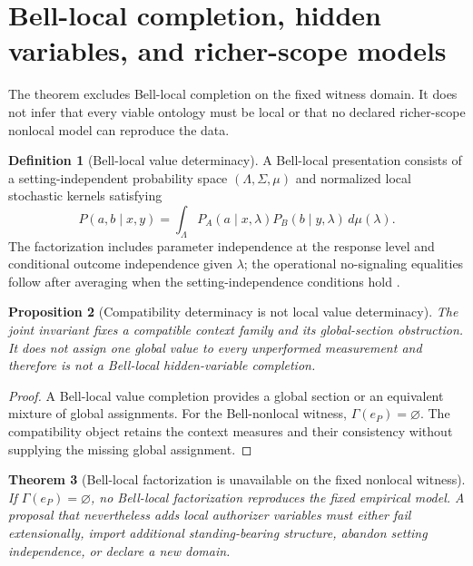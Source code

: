 \documentclass[11pt]{article}
\newtheorem{theorem}{Theorem}[section]
\newtheorem{proposition}[theorem]{Proposition}
\theoremstyle{definition}
\newtheorem{definition}[theorem]{Definition}
\newcommand{\GlobalSec}{\Gamma}
\begin{document}
\section{Bell-local completion, hidden variables, and richer-scope models}\label{sec:hiddenvariables}

The theorem excludes Bell-local completion on the fixed witness domain. It does not infer that every viable ontology must be local or that no declared richer-scope nonlocal model can reproduce the data.

\begin{definition}[Bell-local value determinacy]
A Bell-local presentation consists of a setting-independent probability space $(\Lambda,\Sigma,\mu)$ and normalized local stochastic kernels satisfying
\[
P(a,b\mid x,y)=\int_{\Lambda}P_A(a\mid x,\lambda)P_B(b\mid y,\lambda)\,d\mu(\lambda).
\]
The factorization includes parameter independence at the response level and conditional outcome independence given $\lambda$; the operational no-signaling equalities follow after averaging when the setting-independence conditions hold \cite{Jarrett1984,Shimony1986,Brunner2014}.
\end{definition}

\begin{proposition}[Compatibility determinacy is not local value determinacy]\label{prop:notHV}
The joint invariant fixes a compatible context family and its global-section obstruction. It does not assign one global value to every unperformed measurement and therefore is not a Bell-local hidden-variable completion.
\end{proposition}

\begin{proof}
A Bell-local value completion provides a global section or an equivalent mixture of global assignments. For the Bell-nonlocal witness, $\GlobalSec(e_P)=\varnothing$. The compatibility object retains the context measures and their consistency without supplying the missing global assignment.
\end{proof}

\begin{theorem}[Bell-local factorization is unavailable on the fixed nonlocal witness]\label{thm:belllocalinadmissible}
If $\GlobalSec(e_P)=\varnothing$, no Bell-local factorization reproduces the fixed empirical model. A proposal that nevertheless adds local authorizer variables must either fail extensionally, import additional standing-bearing structure, abandon setting independence, or declare a new domain.
\end{theorem}
\end{document}
